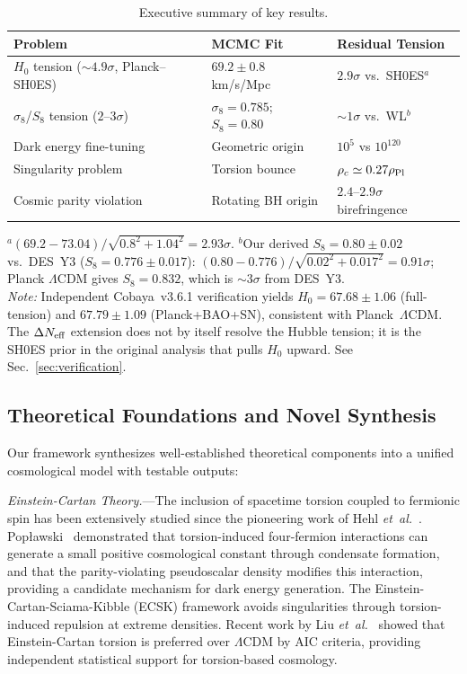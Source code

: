 \documentclass[aps,prd,twocolumn,superscriptaddress,showpacs,preprintnumbers,nofootinbib,longbibliography,floatfix]{revtex4-2}
\newcommand{\rhoPl}{\rho_{\rm Pl}}
\newcommand{\Neff}{N_{\rm eff}}
\newcommand{\etal}{\textit{et~al.}}
\begin{document}
\begin{table}[b]
\caption{\label{tab:summary} Executive summary of key results.}
\begin{ruledtabular}
\begin{tabular}{lll}
\textbf{Problem} & \textbf{MCMC Fit} & \textbf{Residual Tension} \\
\hline
$H_0$ tension (${\sim}4.9\sigma$, Planck--SH0ES) & $69.2\pm 0.8$ km/s/Mpc & $2.9\sigma$ vs.\ SH0ES$^a$ \\
$\sigma_8$/$S_8$ tension ($2$--$3\sigma$) & $\sigma_8 = 0.785$; $S_8 = 0.80$ & ${\sim}1\sigma$ vs.\ WL$^b$ \\
Dark energy fine-tuning & Geometric origin & $10^5$ vs $10^{120}$ \\
Singularity problem & Torsion bounce & $\rho_c \simeq 0.27\rhoPl$ \\
Cosmic parity violation & Rotating BH origin & $2.4$--$2.9\sigma$ birefringence \\
\end{tabular}
\end{ruledtabular}
\vspace{2pt}
{\small $^a$$(69.2-73.04)/\sqrt{0.8^2+1.04^2} = 2.93\sigma$. \quad $^b$Our derived $S_8 = 0.80 \pm 0.02$ vs.\ DES~Y3 ($S_8 = 0.776 \pm 0.017$): $(0.80-0.776)/\sqrt{0.02^2+0.017^2} = 0.91\sigma$; Planck $\Lambda$CDM gives $S_8 = 0.832$, which is ${\sim}3\sigma$ from DES~Y3.\\[3pt]
\textit{Note:} Independent Cobaya~v3.6.1 verification yields $H_0 = 67.68 \pm 1.06$ (full-tension) and $67.79 \pm 1.09$ (Planck+BAO+SN), consistent with Planck~$\Lambda$CDM. The $\Delta\Neff$ extension does not by itself resolve the Hubble tension; it is the SH0ES prior in the original analysis that pulls $H_0$ upward. See Sec.~\ref{sec:verification}.}
\end{table}


\subsection{Theoretical Foundations and Novel Synthesis}\label{sec:foundations}

Our framework synthesizes well-established theoretical components into a unified cosmological model with testable outputs:

\textit{Einstein-Cartan Theory.}---The inclusion of spacetime torsion coupled to fermionic spin has been extensively studied since the pioneering work of Hehl \etal~\cite{Hehl1976}. Pop\l{}awski~\cite{Poplawski2012,Poplawski2011} demonstrated that torsion-induced four-fermion interactions can generate a small positive cosmological constant through condensate formation, and that the parity-violating pseudoscalar density modifies this interaction, providing a candidate mechanism for dark energy generation. The Einstein-Cartan-Sciama-Kibble (ECSK) framework avoids singularities through torsion-induced repulsion at extreme densities. Recent work by Liu \etal~\cite{Liu2025} showed that Einstein-Cartan torsion is preferred over $\Lambda$CDM by AIC criteria, providing independent statistical support for torsion-based cosmology.
\end{document}
